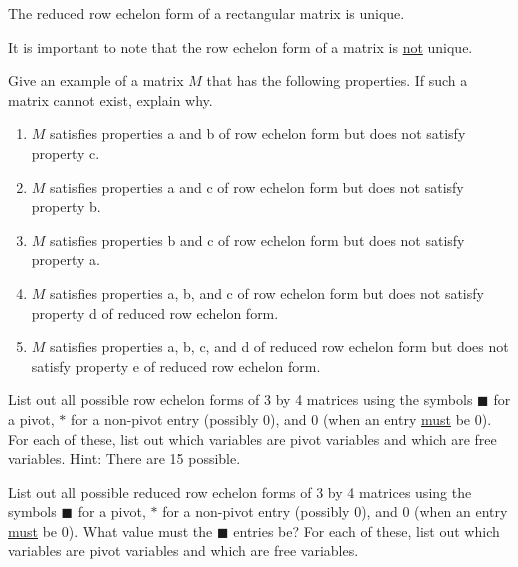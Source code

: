 \begin{theorem} The reduced row echelon form of a rectangular matrix is unique.
\end{theorem}
It is important to note that the row echelon form of a matrix is \underline{not} unique.
\begin{question} Give an example of a matrix $M$ that has the following properties. If such a matrix cannot exist, explain why.
\begin{enumerate}
\item $M$ satisfies properties a and b of row echelon form but does not satisfy property c.
\item $M$ satisfies properties a and c of row echelon form but does not satisfy property b.
\item $M$ satisfies properties b and c of row echelon form but does not satisfy property a.
\item $M$ satisfies properties a, b, and c of row echelon form but does not satisfy property d of reduced row echelon form.
\item $M$ satisfies properties a, b, c, and d of reduced row echelon form but does not satisfy property e of reduced row echelon form.
\end{enumerate}
\end{question}

\begin{question}\label{q5} List out all possible row echelon forms of 3 by 4 matrices using the symbols $\blacksquare$ for a pivot, $*$ for a non-pivot entry (possibly $0$), and $0$ (when an entry \underline{must} be $0$). For each of these, list out which variables are pivot variables and which are free variables. Hint: There are 15 possible.
\end{question}

\begin{question} List out all possible reduced row echelon forms of 3 by 4 matrices using the symbols $\blacksquare$ for a pivot, $*$ for a non-pivot entry (possibly $0$), and $0$ (when an entry \underline{must} be $0$). What value must the $\blacksquare$ entries be? For each of these, list out which variables are pivot variables and which are free variables.
\end{question}

